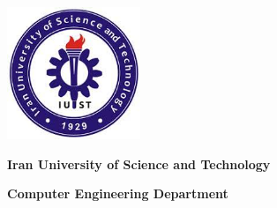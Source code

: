 \documentclass[11pt]{book}
\begin{document}
\beginsupplement

\newpage 

\ %
\newpage 



\vspace*{3cm}
{
\centering
\includegraphics[width=4cm]{iust.jpeg}
\\
\bigbreak
\centerline {\textbf{Iran University of Science and Technology}}
\bigbreak
\large\centerline {\textbf{Computer Engineering Department}}
}
\end{document}
